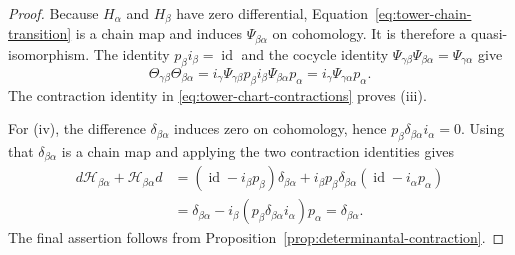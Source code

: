\documentclass[11pt]{article}
\theoremstyle{definition}
\begin{document}
\begin{proof}
Because $H_\alpha$ and $H_\beta$ have zero differential, Equation~\eqref{eq:tower-chain-transition} is a chain map and induces $\Psi_{\beta\alpha}$ on cohomology.  It is therefore a quasi-isomorphism.  The identity $p_\beta i_\beta=\operatorname{id}$ and the cocycle identity
$\Psi_{\gamma\beta}\Psi_{\beta\alpha}=\Psi_{\gamma\alpha}$ give
\[
 \Theta_{\gamma\beta}\Theta_{\beta\alpha}
 =i_\gamma\Psi_{\gamma\beta}p_\beta i_\beta
  \Psi_{\beta\alpha}p_\alpha
 =i_\gamma\Psi_{\gamma\alpha}p_\alpha.
\]
The contraction identity in \eqref{eq:tower-chart-contractions} proves (iii).

For (iv), the difference $\delta_{\beta\alpha}$ induces zero on cohomology, hence
$p_\beta\delta_{\beta\alpha}i_\alpha=0$.  Using that $\delta_{\beta\alpha}$ is a chain map and applying the two contraction identities gives
\begin{align*}
 d\mathcal H_{\beta\alpha}+\mathcal H_{\beta\alpha}d
 &=(\operatorname{id}-i_\beta p_\beta)\delta_{\beta\alpha}
   +i_\beta p_\beta\delta_{\beta\alpha}
    (\operatorname{id}-i_\alpha p_\alpha)\\
 &=\delta_{\beta\alpha}
   -i_\beta(p_\beta\delta_{\beta\alpha}i_\alpha)p_\alpha
 =\delta_{\beta\alpha}.
\end{align*}
The final assertion follows from Proposition~\ref{prop:determinantal-contraction}.
\end{proof}
\end{document}
